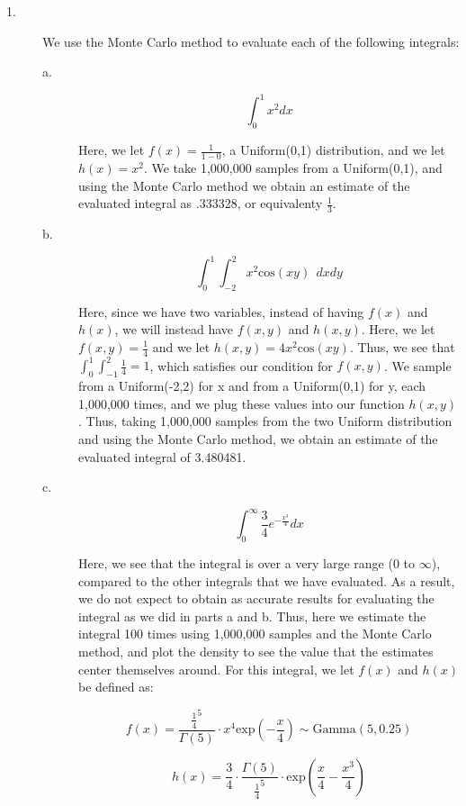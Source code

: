 \documentclass[12pt]{article}
\renewcommand{\title}[1]{\textbf{#1}\\}
\begin{document}
\center{\title{STAT 243 HW\#4}}

\begin{description}


\item[1.] We use the Monte Carlo method to evaluate each of the following integrals:
\begin{description}
\item[a.] \[\int_0^1 x^2 dx\]

Here, we let $f(x) = \frac{1}{1-0}$, a Uniform(0,1) distribution, and we let $h(x) = x^2$. We take 1,000,000 samples from a Uniform(0,1), and using the Monte Carlo method we obtain an estimate of the evaluated integral as .333328, or equivalenty $\frac{1}{3}$.

\item[b.] \[\int_0^1 \int^2_{-2} x^2 \mathrm{cos}(xy) \ \ dx dy\]

Here, since we have two variables, instead of having $f(x)$ and $h(x)$, we will instead have $f(x,y)$ and $h(x,y)$. Here, we let $f(x,y) = \frac{1}{4}$ and we let $h(x,y) = 4x^2\mathrm{cos}(xy)$. Thus, we see that $\int_0^1 \int_{-1}^2 \frac{1}{4} = 1$, which satisfies our condition for $f(x,y)$. We sample from a Uniform(-2,2) for x and from a Uniform(0,1) for y, each 1,000,000 times, and we plug these values into our function $h(x,y)$. Thus, taking 1,000,000 samples from the two Uniform distribution and using the Monte Carlo method, we obtain an estimate of the evaluated integral of 3.480481.

\item[c.] \[\int_0^\infty \frac{3}{4} e^{-\frac{x^3}{4}} dx\]

Here, we see that the integral is over a very large range (0 to $\infty$), compared to the other integrals that we have evaluated. As a result, we do not expect to obtain as accurate results for evaluating the integral as we did in parts a and b. Thus, here we estimate the integral 100 times using 1,000,000 samples and the Monte Carlo method, and plot the density to see the value that the estimates center themselves around. For this integral, we let $f(x)$ and $h(x)$ be defined as:

\[f(x) = \frac{\frac{1}{4}^5}{\Gamma(5)} \cdot x^4 \mathrm{exp}\left(-\frac{x}{4} \right) \sim \mathrm{Gamma}(5, 0.25)\]

\[h(x) = \frac{3}{4} \cdot \frac{\Gamma(5)}{\frac{1}{4}^5} \cdot \mathrm{exp} \left( \frac{x}{4} - \frac{x^3}{4}\right)\]


\end{description}
\end{description}
\end{document}
